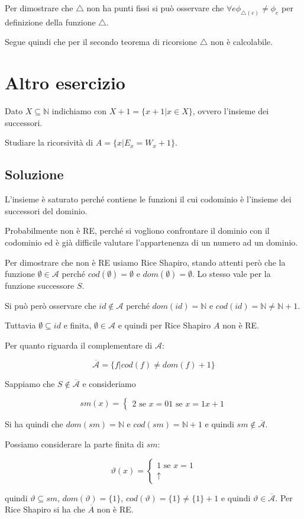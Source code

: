 Per dimostrare che $\bigtriangleup$ non ha punti fissi si può osservare che $\forall e \phi_{\bigtriangleup(e)} \neq \phi_e$ per definizione della funzione $\bigtriangleup$.

Segue quindi che per il secondo teorema di ricorsione $\bigtriangleup$ non è calcolabile.

\section{Altro esercizio}

Dato $X \subseteq \mathbb{N}$ indichiamo con $X+1 = \{ x+1 | x \in X \}$, ovvero l'insieme dei successori.

Studiare la ricorsività di $A = \{ x | E_x = W_x +1 \}$.

\subsection{Soluzione}

L'insieme è saturato perché contiene le funzioni il cui codominio è l'insieme dei successori del dominio.

Probabilmente non è RE, perché si vogliono confrontare il dominio con il codominio ed è già difficile valutare l'appartenenza di un numero ad un dominio.

Per dimostrare che non è RE usiamo Rice Shapiro, stando attenti però che la funzione $\emptyset \in \mathcal{A}$ perché $cod(\emptyset) = \emptyset$ e $dom(\emptyset) = \emptyset$. Lo stesso vale per la funzione successore $S$.

Si può però osservare che $id \notin \mathcal{A}$ perché $dom(id) = \mathbb{N}$ e $cod(id) = \mathbb{N} \neq \mathbb{N} +1$.

Tuttavia $\emptyset \subseteq id$ e finita, $\emptyset \in \mathcal{A}$ e quindi per Rice Shapiro $A$ non è RE.

Per quanto riguarda il complementare di $\mathcal{A}$:

$$
\overline{\mathcal{A}} = \{ f | cod(f) \neq dom(f) +1 \}
$$

Sappiamo che $S \notin \overline{\mathcal{A}}$ e consideriamo

$$
sm(x) = \begin{cases}
	2 \text{ se } x = 0
	1 \text{ se } x = 1
	x+1 
\end{cases}
$$

Si ha quindi che $dom(sm) = \mathbb{N}$ e $cod(sm) = \mathbb{N} +1$ e quindi $sm \notin \overline{\mathcal{A}}$. 

Possiamo considerare la parte finita di $sm$:

$$
\vartheta(x) = \begin{cases}
	1 \text{ se } x= 1\\
	\uparrow
\end{cases}
$$

quindi $\vartheta \subseteq sm$, $dom(\vartheta) = \{1\}$, $cod(\vartheta) = \{1\} \neq \{ 1\} +1$ e quindi $\vartheta \in \overline{\mathcal{A}}$. Per Rice Shapiro si ha che $\overline{A}$ non è RE.
